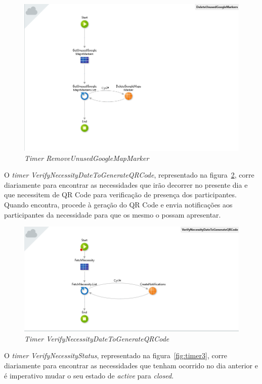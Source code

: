  \begin{figure}[H]
  \centering 
  \includegraphics[scale=0.4]{figures/timer1.png}
  \caption{\textit{Timer RemoveUnusedGoogleMapMarker}}\label{fig:timer1}
\end{figure}


\par
O \textit{timer VerifyNecessityDateToGenerateQRCode}, representado na figura~\ref{fig:timer2}, corre diariamente para encontrar as necessidades que irão decorrer no presente dia e que necessitem de QR Code para verificação de presença dos participantes. 
Quando encontra, procede à geração do QR Code e envia notificações aos participantes da necessidade para que os mesmo o possam apresentar.

\begin{figure}[H]
  \centering 
  \includegraphics[scale=0.4]{figures/timer2.png}
  \caption{\textit{Timer VerifyNecessityDateToGenerateQRCode}}\label{fig:timer2}
\end{figure}


\par
O \textit{timer VerifyNecessityStatus}, representado na figura~\ref{fig:timer3}, corre diariamente para encontrar as necessidades que tenham ocorrido no dia anterior e é imperativo mudar o seu estado de \textit{active} para \textit{closed}. 

